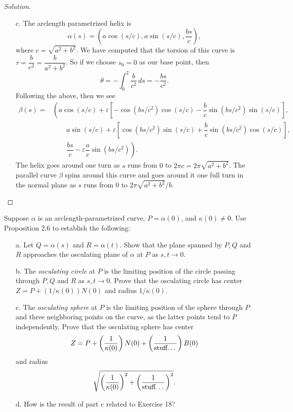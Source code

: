 \documentclass[Shifrin_Solutions_Spring_2018]{subfiles}
\begin{document}
\begin{proof}[Solution]
\begin{itemize}
\item[c.] The arclength parametrized helix is
\[
\alpha(s) = \left( a \cos(s/c), a \sin(s/c) , \dfrac{bs}{c} \right),
\]
where $c = \sqrt{a^2+b^2}$.  We have computed that the torsion of this curve is 
$\tau = \dfrac{b}{c^2}= \dfrac{b}{a^2+b^2}$. So if we choose $s_0=0$ as our base point, 
then
\[
\theta = - \int_0^2 \dfrac{b}{c^2} \, ds = -\dfrac{bs}{c^2}.
\]
Following the above, then we see
\[
\begin{split}
\beta(s) = & \left(  a \cos(s/c) +\varepsilon\left[ -\cos(bs/c^2)\cos(s/c) 
  - \dfrac{b}{c}\sin(bs/c^2)\sin(s/c)\right] , \right. \\
& \qquad a \sin(s/c) +\varepsilon \left[ \cos(bs/c^2)\sin(s/c) + \dfrac{b}{c}\sin(bs/c^2)\cos(s/c)\right] , \\
& \qquad \left. \dfrac{bs}{c} - \varepsilon\dfrac{a}{c}\sin(bs/c^2)  \right) .
\end{split}
\]
The helix goes around one turn as $s$ runs from $0$ to $2\pi c = 2\pi\sqrt{a^2+b^2}$. 
The parallel curve $\beta$ spins around this curve and goes around it one full turn 
in the normal plane as $s$ runs from $0$ to $2\pi\sqrt{a^2+b^2}/b$.


\end{itemize}
\end{proof}

\clearpage

\begin{exercise}
Suppose $\alpha$ is an arclength-parametrized curve, 
$P = \alpha(0)$, and $\kappa(0) \neq 0$. Use Proposition 2.6 to establish the following:
\begin{itemize}
\item[a.] Let $Q = \alpha(s)$ and $R = \alpha(t)$. Show that the plane spanned by 
$P, Q$ and $R$ approaches the osculating plane of $\alpha$ at $P$ as $s,t\rightarrow 0$.
\item[b.] The \emph{osculating circle} at $P$ is the limiting position of the circle 
passing through $P, Q$ and $R$ as $s,t \rightarrow 0$. Prove that the osculating circle 
has center $Z = P + (1/\kappa(0)) N(0)$ and radius $1/\kappa(0)$.
\item[c.] The \emph{osculating sphere} at $P$ is the limiting position of the sphere 
through $P$ and three neighboring points on the curve, as the latter points tend to $P$ 
independently. Prove that the osculating sphere has center
\[
Z= P + \left( \dfrac{1}{\kappa(0)}\right) N(0) + \left(  \dfrac{1}{\text{stuff\dots}}  \right) B(0)
\]
and radius
\[
\sqrt{  \left( \dfrac{1}{\kappa(0)}\right)^2  + \left(  \dfrac{1}{\text{stuff\dots}}  \right)^2 } .
\]
\item[d.] How is the result of part c related to Exercise 18?
\end{itemize}
\end{exercise}
\end{document}
